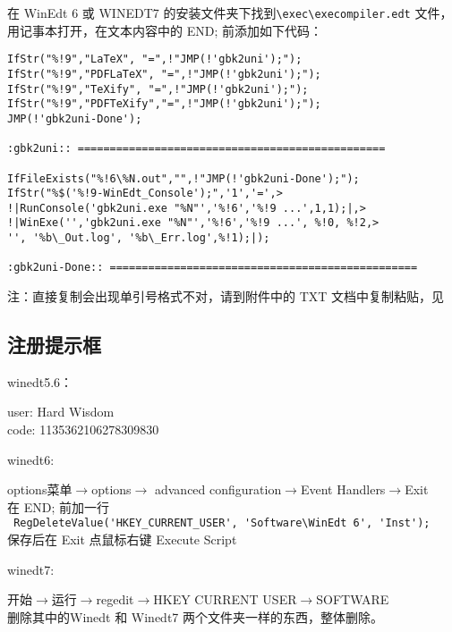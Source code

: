在 WinEdt 6 或 WINEDT7 的安装文件夹下找到\verb|\exec\execompiler.edt| 文件，用记事本打开，在文本内容中的 END; 前添加如下代码：
\scriptsize
\begin{shaded}
\begin{verbatim}
IfStr("%!9","LaTeX", "=",!"JMP(!'gbk2uni');");
IfStr("%!9","PDFLaTeX", "=",!"JMP(!'gbk2uni');");
IfStr("%!9","TeXify", "=",!"JMP(!'gbk2uni');");
IfStr("%!9","PDFTeXify","=",!"JMP(!'gbk2uni');");
JMP(!'gbk2uni-Done');

:gbk2uni:: ================================================

IfFileExists("%!6\%N.out","",!"JMP(!'gbk2uni-Done');");
IfStr("%$('%!9-WinEdt_Console');",'1','=',>
!|RunConsole('gbk2uni.exe "%N"','%!6','%!9 ...',1,1);|,>
!|WinExe('','gbk2uni.exe "%N"','%!6','%!9 ...', %!0, %!2,>
'', '%b\_Out.log', '%b\_Err.log',%!1);|);

:gbk2uni-Done:: ================================================
\end{verbatim}
\end{shaded}
\normalsize
注：直接复制会出现单引号格式不对，请到附件中的 TXT 文档中复制粘贴，见
\subsection{注册提示框}

winedt5.6：
\begin{shaded}
\noindent
user: Hard Wisdom\\
code: 1135362106278309830
\end{shaded}

winedt6:
\begin{shaded}
options菜单$\rightarrow$options$\rightarrow$ advanced configuration$\rightarrow$Event Handlers$\rightarrow$Exit\\
在 END; 前加一行\\
\wuhao\verb| RegDeleteValue('HKEY_CURRENT_USER', 'Software\WinEdt 6', 'Inst');|\\
\normalsize 保存后在 Exit 点鼠标右键 Execute Script
\end{shaded}

winedt7:
\begin{shaded}
开始$\rightarrow$运行$\rightarrow$regedit$\rightarrow$HKEY CURRENT USER$\rightarrow$SOFTWARE\\
删除其中的Winedt 和 Winedt7 两个文件夹一样的东西，整体删除。
\end{shaded}

